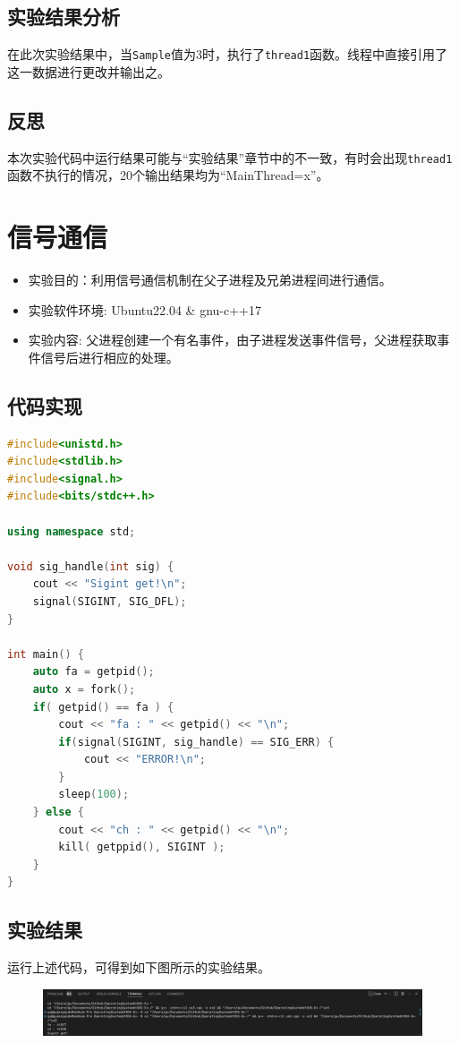 \documentclass[UTF8]{ctexart}
\begin{document}
\subsection{实验结果分析}
在此次实验结果中，当\texttt{Sample}值为3时，执行了\texttt{thread1}函数。线程中直接引用了这一数据进行更改并输出之。
\subsection{反思}
本次实验代码中运行结果可能与“实验结果”章节中的不一致，有时会出现\texttt{thread1}函数不执行的情况，20个输出结果均为“MainThread=x”。
\clearpage
\section{信号通信}
\begin{itemize}
	\item 实验目的：利用信号通信机制在父子进程及兄弟进程间进行通信。
	\item 实验软件环境: Ubuntu22.04 \& gnu-c++17
	\item 实验内容: 父进程创建一个有名事件，由子进程发送事件信号，父进程获取事件信号后进行相应的处理。
\end{itemize}
\subsection{代码实现}
\begin{lstlisting}[language=c++]
#include<unistd.h>
#include<stdlib.h>
#include<signal.h>
#include<bits/stdc++.h>

using namespace std;

void sig_handle(int sig) {
	cout << "Sigint get!\n";
	signal(SIGINT, SIG_DFL);
}
	
int main() {
	auto fa = getpid();
	auto x = fork();
	if( getpid() == fa ) {
		cout << "fa : " << getpid() << "\n";
		if(signal(SIGINT, sig_handle) == SIG_ERR) {
			cout << "ERROR!\n";
		}
		sleep(100);
	} else {
		cout << "ch : " << getpid() << "\n";
		kill( getppid(), SIGINT );
	} 
}
\end{lstlisting}
\subsection{实验结果}
运行上述代码，可得到如下图所示的实验结果。
\begin{figure}[htbp]
	\begin{center}
		\includegraphics[width=0.8\pdfpagewidth]{os3-1.png}
	\end{center}
\end{figure}
\end{document}

